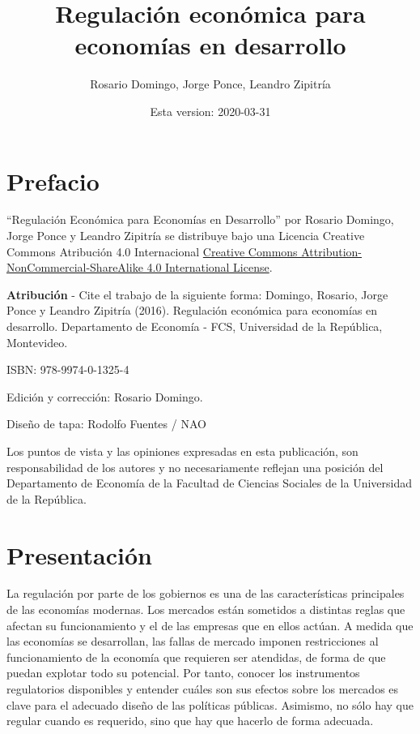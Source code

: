 \documentclass[
  12pt,
  spanish,
]{book}
\title{Regulación económica para economías en desarrollo}
\author{Rosario Domingo, Jorge Ponce, Leandro Zipitría}
\date{Esta version: 2020-03-31}
\begin{document}
\maketitle

{
\setcounter{tocdepth}{1}
\tableofcontents
}
\hypertarget{prefacio}{%
\chapter*{Prefacio}\label{prefacio}}

``Regulación Económica para Economías en Desarrollo'' por Rosario Domingo, Jorge Ponce y Leandro Zipitría se distribuye bajo una Licencia Creative Commons Atribución 4.0 Internacional \href{http://creativecommons.org/licenses/by-nc-sa/4.0/}{Creative Commons Attribution-NonCommercial-ShareAlike 4.0 International License}.

\textbf{Atribución} - Cite el trabajo de la siguiente forma: Domingo, Rosario, Jorge Ponce y Leandro Zipitría (2016). Regulación económica para economías en desarrollo. Departamento de Economía - FCS, Universidad de la República, Montevideo.

ISBN: 978-9974-0-1325-4

Edición y corrección: Rosario Domingo.

Diseño de tapa: Rodolfo Fuentes / NAO

Los puntos de vista y las opiniones expresadas en esta publicación, son responsabilidad de los autores y no necesariamente reflejan una posición del Departamento de Economía de la Facultad de Ciencias Sociales de la Universidad de la República.

\newpage

\hypertarget{intro}{%
\chapter*{Presentación}\label{intro}}

La regulación por parte de los gobiernos es una de las características principales de las economías modernas. Los mercados están sometidos a distintas reglas que afectan su funcionamiento y el de las empresas que en ellos actúan. A medida que las economías se desarrollan, las fallas de mercado imponen restricciones al funcionamiento de la economía que requieren ser atendidas, de forma de que puedan explotar todo su potencial. Por tanto, conocer los instrumentos regulatorios disponibles y entender cuáles son sus efectos sobre los mercados es clave para el adecuado diseño de las políticas públicas. Asimismo, no sólo hay que regular cuando es requerido, sino que hay que hacerlo de forma adecuada.
\end{document}
